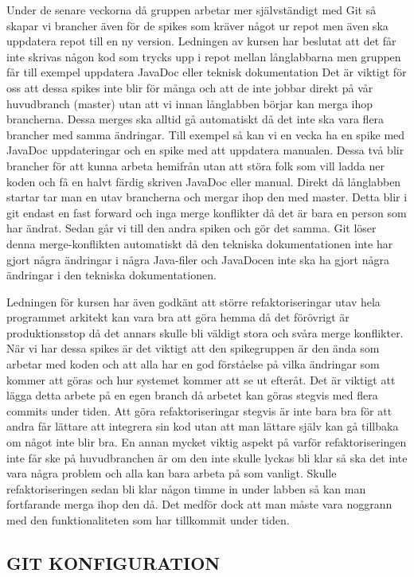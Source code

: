 Under de senare veckorna då gruppen arbetar mer självständigt med Git så skapar vi brancher även för de spikes som kräver något ur repot men även ska uppdatera repot till en ny version. Ledningen av kursen har beslutat att det får inte skrivas någon kod som trycks upp i repot mellan långlabbarna men gruppen får till exempel uppdatera JavaDoc eller teknisk dokumentation Det är viktigt för oss att dessa spikes inte blir för många och att de inte jobbar direkt på vår huvudbranch (master) utan att vi innan långlabben börjar kan merga ihop brancherna. Dessa merges ska alltid gå automatiskt då det inte ska vara flera brancher med samma ändringar. Till exempel så kan vi en vecka ha en spike med JavaDoc uppdateringar och en spike med att uppdatera manualen. Dessa två blir brancher för att kunna arbeta hemifrån utan att störa folk som vill ladda ner koden och få en halvt färdig skriven JavaDoc eller manual. Direkt då långlabben startar tar man en utav brancherna och mergar ihop den med master. Detta blir i git endast en fast forward och inga merge konflikter då det är bara en person som har ändrat. Sedan går vi till den andra spiken och gör det samma. Git löser denna merge-konflikten automatiskt då den tekniska dokumentationen inte har gjort några ändringar i några Java-filer och JavaDocen inte ska ha gjort några ändringar i den tekniska dokumentationen.

Ledningen för kursen har även godkänt att större refaktoriseringar utav hela programmet arkitekt kan vara bra att göra hemma då det förövrigt är produktionsstop då det annars skulle bli väldigt stora och svåra merge konflikter. När vi har dessa spikes är det viktigt att den spikegruppen är den ända som arbetar med koden och att alla har en god förståelse på vilka ändringar som kommer att göras och hur systemet kommer att se ut efteråt. Det är viktigt att lägga detta arbete på en egen branch då arbetet kan göras stegvis med flera commits under tiden. Att göra refaktoriseringar stegvis är inte bara bra för att andra får lättare att integrera sin kod utan att man lättare själv kan gå tillbaka om något inte blir bra. En annan mycket viktig aspekt på varför refaktoriseringen inte får ske på huvudbranchen är om den inte skulle lyckas bli klar så ska det inte vara några problem och alla kan bara arbeta på som vanligt. Skulle refaktoriseringen sedan bli klar någon timme in under labben så kan man fortfarande merga ihop den då. Det medför dock att man måste vara noggrann med den funktionaliteten som har tillkommit under tiden.

\subsection{GIT KONFIGURATION}

